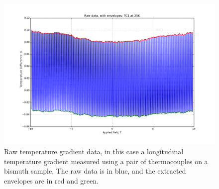 \documentclass{thesis-umich}
\begin{document}
\begin{figure}
	\caption[Raw Temperature Gradient Data]{Raw temperature gradient data, in this case a longitudinal temperature gradient measured using a pair of thermocouples on a bismuth sample. The raw data is in blue, and the extracted envelopes are in red and green.}
	\label{fig:raw_data}
	\includegraphics[width=\columnwidth]{figures/25K_TC1_Raw.png}
\end{figure}
\end{document}

